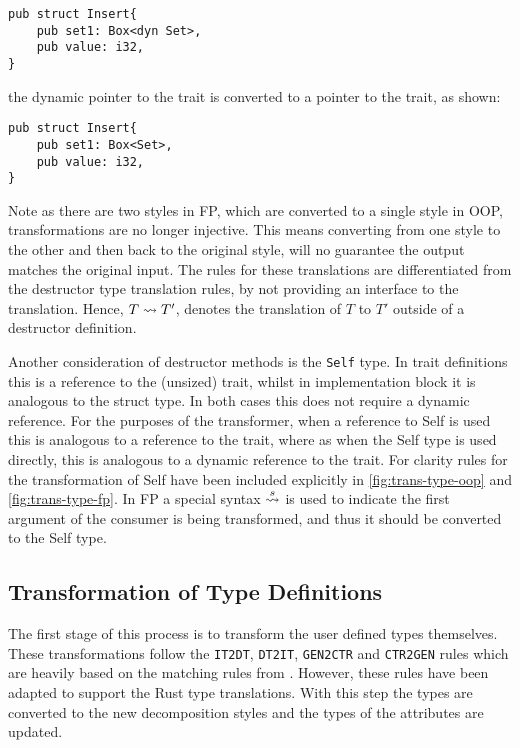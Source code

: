\documentclass[ oneside,%
                    author={James Elgar},
                    degree={MEng},
                     title={Bidirectional transformer between functional and \\ object-oriented programming in Rust},
                  subtitle={}]{dissertation}
\begin{document}
\begin{verbatim}
pub struct Insert{
    pub set1: Box<dyn Set>,
    pub value: i32,
}
\end{verbatim}

the dynamic pointer to the trait is converted to a pointer to the trait, as shown:

\begin{verbatim}
pub struct Insert{
    pub set1: Box<Set>,
    pub value: i32,
}
\end{verbatim}

Note as there are two styles in FP, which are converted to a single style in OOP, transformations are no longer injective. This means converting from one style to the other and then back to the original style, will no guarantee the output matches the original input. The rules for these translations are differentiated from the destructor type translation rules, by not providing an interface to the translation. Hence, $T \overset{}{\leadsto} T'$, denotes the translation of $T$ to $T'$ outside of a destructor definition.

Another consideration of destructor methods is the \verb|Self| type. In trait definitions this is a reference to the (unsized) trait, whilst in implementation block it is analogous to the struct type. In both cases this does not require a dynamic reference. For the purposes of the transformer, when a reference to Self is used this is analogous to a reference to the trait, where as when the Self type is used directly, this is analogous to a dynamic reference to the trait. For clarity rules for the transformation of Self have been included explicitly in \autoref{fig:trans-type-oop} and \autoref{fig:trans-type-fp}. In FP a special syntax $\overset{s}{\leadsto}$ is used to indicate the first argument of the consumer is being transformed, and thus it should be converted to the Self type.


\subsection{Transformation of Type Definitions}

The first stage of this process is to transform the user defined types themselves. These transformations follow the \verb|IT2DT|, \verb|DT2IT|, \verb|GEN2CTR| and \verb|CTR2GEN| rules which are heavily based on the matching rules from \cite{food}. However, these rules have been adapted to support the Rust type translations. With this step the types are converted to the new decomposition styles and the types of the attributes are updated.
\end{document}
